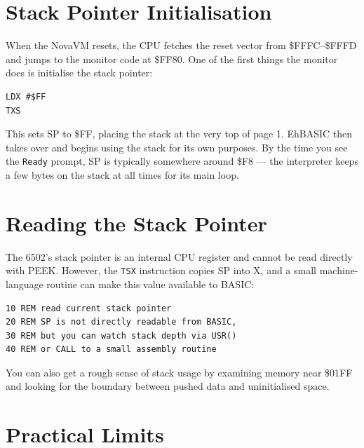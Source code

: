 \section{Stack Pointer Initialisation}

When the NovaVM resets, the CPU fetches the reset vector from \$FFFC--\$FFFD and
jumps to the monitor code at \$FF80.  One of the first things the monitor does
is initialise the stack pointer:

\begin{lstlisting}
LDX #$FF
TXS
\end{lstlisting}

This sets SP to \$FF, placing the stack at the very top of page 1.  EhBASIC
then takes over and begins using the stack for its own purposes.  By the time
you see the \texttt{Ready} prompt, SP is typically somewhere around \$F8 ---
the interpreter keeps a few bytes on the stack at all times for its main loop.

\section{Reading the Stack Pointer}

The 6502's stack pointer is an internal CPU register and cannot be read
directly with PEEK.  However, the \texttt{TSX} instruction copies SP into X,
and a small machine-language routine can make this value available to BASIC:

\begin{lstlisting}
10 REM read current stack pointer
20 REM SP is not directly readable from BASIC,
30 REM but you can watch stack depth via USR()
40 REM or CALL to a small assembly routine
\end{lstlisting}

You can also get a rough sense of stack usage by examining memory near \$01FF
and looking for the boundary between pushed data and uninitialised space.

\section*{Practical Limits}


